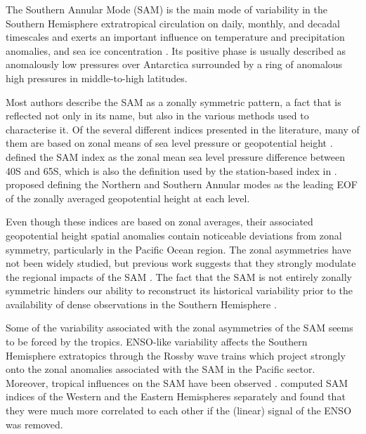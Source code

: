 \documentclass[smallextended]{svjour3}       %
\begin{document}
The Southern Annular Mode (SAM) is the main mode of variability in the Southern Hemisphere extratropical circulation \citep{rogers1982} on daily, monthly, and decadal timescales \citep{baldwin2001a, fogt2006} and exerts an important influence on temperature and precipitation anomalies, and sea ice concentration \citep[e.g.][]{fogt2020}.
Its positive phase is usually described as anomalously low pressures over Antarctica surrounded by a ring of anomalous high pressures in middle-to-high latitudes.

Most authors describe the SAM as a zonally symmetric pattern, a fact that is reflected not only in its name, but also in the various methods used to characterise it.
Of the several different indices presented in the literature, many of them are based on zonal means of sea level pressure or geopotential height \citep{ho2012}.
\citet{gong1999} defined the SAM index as the zonal mean sea level pressure difference between 40\degree S and 65\degree S, which is also the definition used by the station-based index in \citet{marshall2003}.
\citet{baldwin2009} proposed defining the Northern and Southern Annular modes as the leading EOF of the zonally averaged geopotential height at each level.

Even though these indices are based on zonal averages, their associated geopotential height spatial anomalies contain noticeable deviations from zonal symmetry, particularly in the Pacific Ocean region.
The zonal asymmetries have not been widely studied, but previous work suggests that they strongly modulate the regional impacts of the SAM \citep{fan2007, silvestri2009, fogt2012, rosso2018}.
The fact that the SAM is not entirely zonally symmetric hinders our ability to reconstruct its historical variability prior to the availability of dense observations in the Southern Hemisphere \citep{jones2009}.

Some of the variability associated with the zonal asymmetries of the SAM seems to be forced by the tropics.
ENSO-like variability affects the Southern Hemisphere extratopics through the Rossby wave trains \citep{mo1987, kidson1988, karoly1989} which project strongly onto the zonal anomalies associated with the SAM in the Pacific sector.
Moreover, tropical influences on the SAM have been observed \citep{fan2007, fogt2011, clem2013}.
\citet{fan2007} computed SAM indices of the Western and the Eastern Hemispheres separately and found that they were much more correlated to each other if the (linear) signal of the ENSO was removed.
\end{document}
